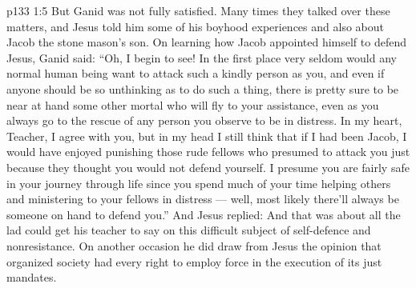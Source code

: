 \vs p133 1:5 But Ganid was not fully satisfied. Many times they talked over these matters, and Jesus told him some of his boyhood experiences and also about Jacob the stone mason’s son. On learning how Jacob appointed himself to defend Jesus, Ganid said: “Oh, I begin to see! In the first place very seldom would any normal human being want to attack such a kindly person as you, and even if anyone should be so unthinking as to do such a thing, there is pretty sure to be near at hand some other mortal who will fly to your assistance, even as you always go to the rescue of any person you observe to be in distress. In my heart, Teacher, I agree with you, but in my head I still think that if I had been Jacob, I would have enjoyed punishing those rude fellows who presumed to attack you just because they thought you would not defend yourself. I presume you are fairly safe in your journey through life since you spend much of your time helping others and ministering to your fellows in distress --- well, most likely there’ll always be someone on hand to defend you.” And Jesus replied:  And that was about all the lad could get his teacher to say on this difficult subject of self\hyp{}defence and nonresistance. On another occasion he did draw from Jesus the opinion that organized society had every right to employ force in the execution of its just mandates.
